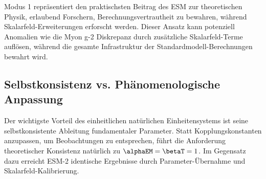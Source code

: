 	Modus 1 repräsentiert den praktischsten Beitrag des ESM zur theoretischen Physik, erlaubend Forschern, Berechnungsvertrautheit zu bewahren, während Skalarfeld-Erweiterungen erforscht werden. Dieser Ansatz kann potenziell Anomalien wie die Myon g-2 Diskrepanz durch zusätzliche Skalarfeld-Terme auflösen, während die gesamte Infrastruktur der Standardmodell-Berechnungen bewahrt wird.
	
	\subsection{Selbstkonsistenz vs. Phänomenologische Anpassung}
	\label{subsec:self_consistency_comparison}
	
	\begin{table}[ht]
		\centering
		\caption{Vergleich theoretischer Grundlagen}
		\label{tab:theoretical_foundations}
	\end{table}
	
	Der wichtigste Vorteil des einheitlichen natürlichen Einheitensystems ist seine selbstkonsistente Ableitung fundamentaler Parameter. Statt Kopplungskonstanten anzupassen, um Beobachtungen zu entsprechen, führt die Anforderung theoretischer Konsistenz natürlich zu $\alphaEM = \betaT = 1$. Im Gegensatz dazu erreicht ESM-2 identische Ergebnisse durch Parameter-Übernahme und Skalarfeld-Kalibrierung.
	
